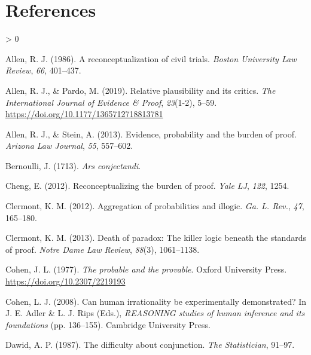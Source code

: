 \documentclass[
  10pt,
  dvipsnames,enabledeprecatedfontcommands]{scrartcl}
\newlength{\cslhangindent}
\newenvironment{CSLReferences}[2] %
 {%
  \setlength{\parindent}{0pt}
  \ifodd #1 \everypar{\setlength{\hangindent}{\cslhangindent}}\ignorespaces\fi
  \ifnum #2 > 0
  \setlength{\parskip}{#2\baselineskip}
  \fi
 }%
 {}
\begin{document}
\hypertarget{references}{%
\section*{References}\label{references}}

\hypertarget{refs}{}
\begin{CSLReferences}{1}{0}
\leavevmode\hypertarget{ref-Allen1986A-Reconceptuali}{}%
Allen, R. J. (1986). A reconceptualization of civil trials. \emph{Boston
University Law Review}, \emph{66}, 401--437.

\leavevmode\hypertarget{ref-AllenPardo2019relative}{}%
Allen, R. J., \& Pardo, M. (2019). Relative plausibility and its
critics. \emph{The International Journal of Evidence {\&} Proof},
\emph{23}(1-2), 5--59. \url{https://doi.org/10.1177/1365712718813781}

\leavevmode\hypertarget{ref-allen2013}{}%
Allen, R. J., \& Stein, A. (2013). Evidence, probability and the burden
of proof. \emph{Arizona Law Journal}, \emph{55}, 557--602.

\leavevmode\hypertarget{ref-Bernoulli1713Ars-conjectandi}{}%
Bernoulli, J. (1713). \emph{Ars conjectandi}.

\leavevmode\hypertarget{ref-cheng2012reconceptualizing}{}%
Cheng, E. (2012). Reconceptualizing the burden of proof. \emph{Yale LJ},
\emph{122}, 1254.

\leavevmode\hypertarget{ref-clermont2012aggregation}{}%
Clermont, K. M. (2012). Aggregation of probabilities and illogic.
\emph{Ga. L. Rev.}, \emph{47}, 165--180.

\leavevmode\hypertarget{ref-clermont2013paradox}{}%
Clermont, K. M. (2013). Death of paradox: The killer logic beneath the
standards of proof. \emph{Notre Dame Law Review}, \emph{88}(3),
1061--1138.

\leavevmode\hypertarget{ref-Cohen1977The-probable-an}{}%
Cohen, J. L. (1977). \emph{The probable and the provable}. Oxford
University Press. \url{https://doi.org/10.2307/2219193}

\leavevmode\hypertarget{ref-cohen1981can}{}%
Cohen, L. J. (2008). Can human irrationality be experimentally
demonstrated? In J. E. Adler \& L. J. Rips (Eds.), \emph{REASONING
studies of human inference and its foundations} (pp. 136--155).
Cambridge University Press.

\leavevmode\hypertarget{ref-dawid1987difficulty}{}%
Dawid, A. P. (1987). The difficulty about conjunction. \emph{The
Statistician}, 91--97.


\end{CSLReferences}
\end{document}
